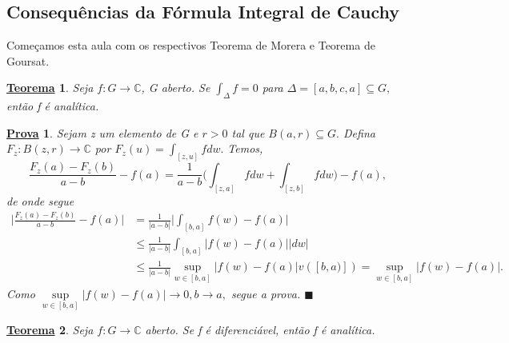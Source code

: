 \documentclass{article}
\newtheorem*{theorem*}{\underline{Teorema}}
\newtheorem*{proof*}{\underline{Prova}}
\renewcommand\qedsymbol{$\blacksquare$}
\begin{document}
\subsection{Consequ\^encias da F\'ormula Integral de Cauchy}
  Come\c camos esta aula com os respectivos Teorema de Morera e Teorema de Goursat.
\begin{theorem*}
  Seja $f:G\rightarrow \mathbb{C}$, G aberto. Se $\int_{\Delta}^{}f = 0$ para $\Delta = [a, b, c, a]\subseteq{G},$ ent\~ao
f \'e anal\'itica.
\end{theorem*}
\begin{proof*}
  Sejam z um elemento de G e $r > 0$ tal que $B(a, r)\subseteq{G}.$ Defina
  $F_{z}:B(z, r)\rightarrow \mathbb{C}$ por $F_{z}(u) = \int_{[z, u]}^{}f dw.$
Temos,
  $$
  \frac{F_{z}(a) - F_{z}(b)}{a - b} - f(a) = \frac{1}{a-b}\biggl(\int_{[z, a]}^{}fdw + \int_{[z, b]}^{}fdw\biggr) - f(a),
  $$
de onde segue 
 \begin{align*}
   \biggl|\frac{F_{z}(a) - F_{z}(b)}{a-b} - f(a)\biggr| &= \frac{1}{|a-b|}\biggl|\int_{[b, a]}f(w) - f(a)\biggr| \\
                                                        &\leq \frac{1}{|a-b|}\int_{[b, a]}^{}|f(w) - f(a)||dw| \\
                                                        &\leq \frac{1}{|a-b|}\sup_{w\in[b, a]}|f(w) - f(a)|v([b, a)]) = \sup_{w\in[b, a]}|f(w)-f(a)|.
 \end{align*}
 Como $\sup\limits_{w\in[b, a]}|f(w) - f(a)|\to0, b\to{a},$ segue a prova. \qedsymbol
\end{proof*}
\begin{theorem*}
  Seja $f:G\rightarrow \mathbb{C}$ aberto. Se f \'e diferenci\'avel, ent\~ao f \'e anal\'itica.
\end{theorem*}
\end{document}
